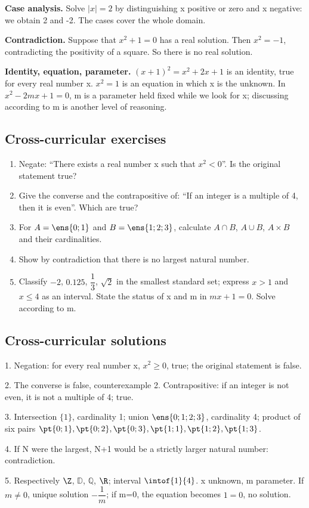 \textbf{Case analysis.} Solve $|x|=2$ by distinguishing x positive or zero and x negative: we obtain 2 and -2. The cases cover the whole domain.\par
\textbf{Contradiction.} Suppose that $x^2+1=0$ has a real solution. Then $x^2=-1$, contradicting the positivity of a square. So there is no real solution.\par
\textbf{Identity, equation, parameter.} $(x+1)^2=x^2+2x+1$ is an identity, true for every real number x. $x^2=1$ is an equation in which x is the unknown. In $x^2-2mx+1=0$, m is a parameter held fixed while we look for x; discussing according to m is another level of reasoning.

\subsection*{Cross-curricular exercises}\label{LOG-EX}
\begin{enumerate}
\item Negate: ``There exists a real number x such that $x^2<0$''. Is the original statement true?
\item Give the converse and the contrapositive of: ``If an integer is a multiple of 4, then it is even''. Which are true?
\item For $A=\ens{0;1}$ and $B=\ens{1;2;3}$, calculate $A\cap B$, $A\cup B$, $A\times B$ and their cardinalities.
\item Show by contradiction that there is no largest natural number.
\item Classify $-2$, $\num{0,125}$, $\dfrac{1}{3}$, $\sqrt2$ in the smallest standard set; express $x>1$ and $x\leq4$ as an interval. State the status of x and m in $mx+1=0$. Solve according to m.
\end{enumerate}
\ifmxteacher
\subsection*{Cross-curricular solutions}
1. Negation: for every real number x, $x^2\geq0$, true; the original statement is false.\par
2. The converse is false, counterexample 2. Contrapositive: if an integer is not even, it is not a multiple of 4; true.\par
3. Intersection $\{1\}$, cardinality 1; union $\ens{0;1;2;3}$, cardinality 4; product of six pairs $\pt{0;1},\pt{0;2},\pt{0;3},\pt{1;1},\pt{1;2},\pt{1;3}$.\par
4. If N were the largest, N+1 would be a strictly larger natural number: contradiction.\par
5. Respectively $\Z$, $\mathbb D$, $\mathbb Q$, $\R$; interval $\intof{1}{4}$. x unknown, m parameter. If $m\ne0$, unique solution $-\dfrac{1}{m}$; if m=0, the equation becomes $1=0$, no solution.
\fi

